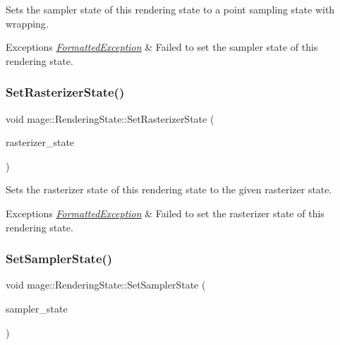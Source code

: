 Sets the sampler state of this rendering state to a point sampling state with wrapping.


\begin{DoxyExceptions}{Exceptions}
{\em \hyperlink{structmage_1_1_formatted_exception}{Formatted\+Exception}} & Failed to set the sampler state of this rendering state. \\
\hline
\end{DoxyExceptions}
\hypertarget{structmage_1_1_rendering_state_a44d2892e59966697e79b80eb0cd847f7}{}\label{structmage_1_1_rendering_state_a44d2892e59966697e79b80eb0cd847f7} 
\subsubsection{\texorpdfstring{Set\+Rasterizer\+State()}{SetRasterizerState()}}
{\footnotesize\ttfamily void mage\+::\+Rendering\+State\+::\+Set\+Rasterizer\+State (\begin{DoxyParamCaption}\item[{I\+D3\+D11\+Rasterizer\+State $\ast$}]{rasterizer\+\_\+state }\end{DoxyParamCaption})\hspace{0.3cm}{\ttfamily [noexcept]}}

Sets the rasterizer state of this rendering state to the given rasterizer state.


\begin{DoxyExceptions}{Exceptions}
{\em \hyperlink{structmage_1_1_formatted_exception}{Formatted\+Exception}} & Failed to set the rasterizer state of this rendering state. \\
\hline
\end{DoxyExceptions}
\hypertarget{structmage_1_1_rendering_state_a3829b0bd0eaedc664542481445ab226b}{}\label{structmage_1_1_rendering_state_a3829b0bd0eaedc664542481445ab226b} 
\subsubsection{\texorpdfstring{Set\+Sampler\+State()}{SetSamplerState()}}
{\footnotesize\ttfamily void mage\+::\+Rendering\+State\+::\+Set\+Sampler\+State (\begin{DoxyParamCaption}\item[{I\+D3\+D11\+Sampler\+State $\ast$}]{sampler\+\_\+state }\end{DoxyParamCaption})\hspace{0.3cm}{\ttfamily [noexcept]}}

